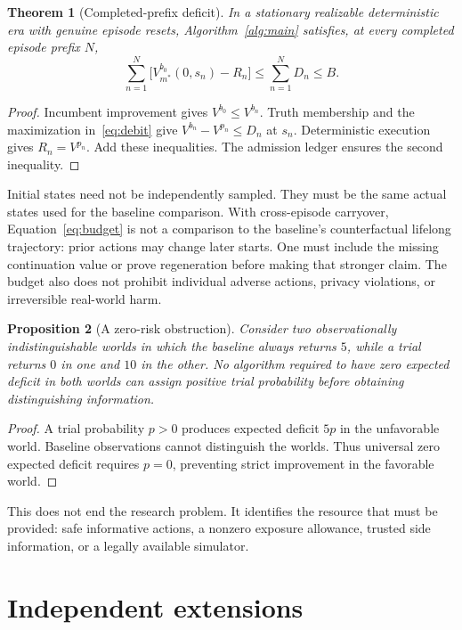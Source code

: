 \documentclass[10pt,twocolumn]{article}
\newtheorem{theorem}{Theorem}
\newtheorem{proposition}[theorem]{Proposition}
\begin{document}
\begin{theorem}[Completed-prefix deficit]\label{thm:budget}
In a stationary realizable deterministic era with genuine episode resets,
Algorithm~\ref{alg:main} satisfies, at every completed episode prefix $N$,
\begin{equation}
 \sum_{n=1}^N\big[V_{m^*}^{b_0}(0,s_n)-R_n\big]
 \leq\sum_{n=1}^ND_n\leq B.\label{eq:budget}
\end{equation}
\end{theorem}
\begin{proof}
Incumbent improvement gives $V^{b_0}\leq V^{b_n}$. Truth membership and the
maximization in~\eqref{eq:debit} give $V^{b_n}-V^{p_n}\leq D_n$ at $s_n$.
Deterministic execution gives $R_n=V^{p_n}$. Add these inequalities. The admission
ledger ensures the second inequality.
\end{proof}

Initial states need not be independently sampled. They must be the same actual
states used for the baseline comparison. With cross-episode carryover,
Equation~\eqref{eq:budget} is not a comparison to the baseline's counterfactual
lifelong trajectory: prior actions may change later starts. One must include the
missing continuation value or prove regeneration before making that stronger
claim. The budget also does not prohibit individual adverse actions, privacy
violations, or irreversible real-world harm.

\begin{proposition}[A zero-risk obstruction]
Consider two observationally indistinguishable worlds in which the baseline
always returns $5$, while a trial returns $0$ in one and $10$ in the other.
No algorithm required to have zero expected deficit in both worlds can assign
positive trial probability before obtaining distinguishing information.
\end{proposition}
\begin{proof}
A trial probability $p>0$ produces expected deficit $5p$ in the unfavorable world.
Baseline observations cannot distinguish the worlds. Thus universal zero expected
deficit requires $p=0$, preventing strict improvement in the favorable world.
\end{proof}

This does not end the research problem. It identifies the resource that must be
provided: safe informative actions, a nonzero exposure allowance, trusted side
information, or a legally available simulator.

\section{Independent extensions}
\end{document}
